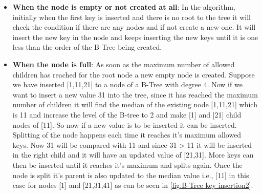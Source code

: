 \begin{itemize}
\item
\textbf{When the node is empty or not created at all}:
In the algorithm, initially when the first key is inserted and there is no root to the tree it will check the condition if there are any nodes and if not create a new one. It will insert the new key in the node and keeps inserting the new keys until it is one less than the order of the B-Tree being created. 
\item
\textbf{When the node is full}:
As soon as the maximum number of allowed children has reached for the root node a new empty node is created. Suppose we have inserted [1,11,21] to a node of a B-Tree with degree 4. Now if we want to insert a new value 31 into the tree, since it has reached the maximum number of children it will find the median of the existing node [1,11,21] which is 11 and increase the level of the B-tree to 2 and make [1] and [21] child nodes of [11]. So now if a new value is to be inserted it can be inserted. Splitting of the node happens each time it reaches it's maximum allowed keys. Now 31 will be compared with 11 and since 31 > 11 it will be inserted in the right child and it will have an updated value of [21,31]. More keys can then be inserted until it reaches it's maximum and splits again. Once the node is split it's parent is also updated to the median value i.e., [11] in this case for nodes [1] and [21,31,41] as can be seen in \ref{fig:B-Tree key insertion2}.
\end{itemize}